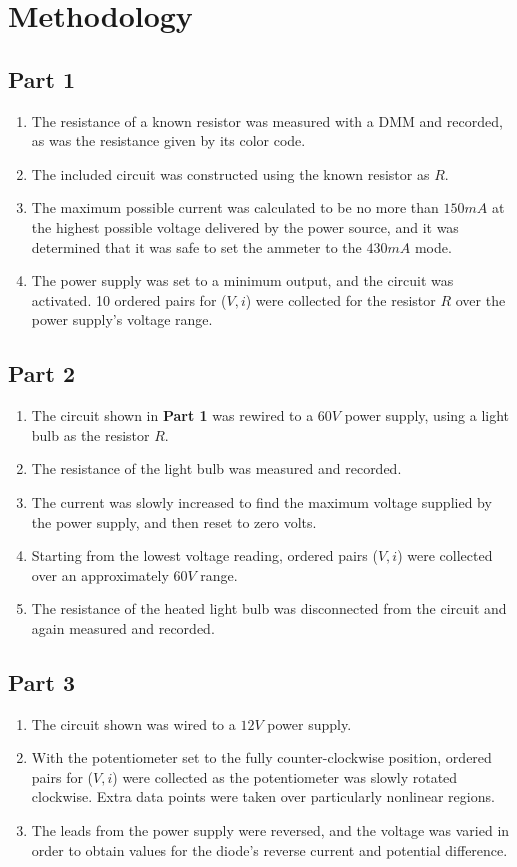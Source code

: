 \documentclass[twocolumn,english]{IEEEtran}
\theoremstyle{plain}
\theoremstyle{plain}
\begin{document}
\section{Methodology}

\subsection*{Part 1}

\begin{enumerate}
 \item The resistance of a known resistor was measured with a DMM and recorded, as was the resistance given by its color code.
 \item The included circuit was constructed using the known resistor as $R$.
 \item The maximum possible current was calculated to be no more than $150 mA$ at the highest possible voltage delivered by the power source, and it was determined that it was safe to set the ammeter to the $430 mA$ mode.
 \item The power supply was set to a minimum output, and the circuit was activated. 10 ordered pairs for ($V,i$) were collected for the resistor $R$ over the power supply's voltage range.
\end{enumerate}

\subsection*{Part 2}

\begin{enumerate}
 \item The circuit shown in \textbf{Part 1} was rewired to a $60 V$ power supply, using a light bulb as the resistor $R$.
 \item The resistance of the light bulb was measured and recorded.
 \item The current was slowly increased to find the maximum voltage supplied by the power supply, and then reset to zero volts.
 \item Starting from the lowest voltage reading, ordered pairs ($V,i$) were collected over an approximately $60 V$ range.
 \item The resistance of the heated light bulb was disconnected from the circuit and again measured and recorded.
\end{enumerate}

\subsection*{Part 3}
\begin{enumerate}
 \item The circuit shown was wired to a $12 V$ power supply.
 \item With the potentiometer set to the fully counter-clockwise position, ordered pairs for ($V,i$) were collected as the potentiometer was slowly rotated clockwise. Extra data points were taken over particularly nonlinear regions.
 \item The leads from the power supply were reversed, and the voltage was varied in order to obtain values for the diode's reverse current and potential difference.
\end{enumerate}
\newpage
\end{document}
